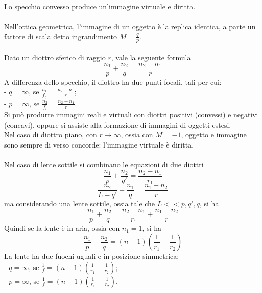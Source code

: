 \documentclass{article}
\begin{document}
Lo specchio convesso produce un’immagine virtuale e diritta.\\
\\
Nell’ottica geometrica, l’immagine di un oggetto è la replica identica, a parte un fattore di scala detto ingrandimento $M=\frac{q}{p}$.\\
\\
Dato un diottro sferico di raggio $r$, vale la seguente formula
\begin{equation}
    \frac{n_1}{p}+\frac{n_2}{q}=\frac{n_2-n_1}{r}
    \nonumber
\end{equation}
A differenza dello specchio, il diottro ha due punti focali, tali per cui:\\
- $q=\infty$, se $\frac{n_1}{f_e}=\frac{n_2-n_1}{r}$;\\
- $p=\infty$, se $\frac{n_2}{f_i}=\frac{n_2-n_1}{r}$.\\
Si può produrre immagini reali e virtuali con diottri positivi (convessi) e negativi (concavi), oppure si assiste alla formazione di immagini di oggetti estesi.\\
Nel caso di diottro piano, con $r\rightarrow \infty$, ossia con $M=-1$, oggetto e immagine sono sempre di verso concorde: l'immagine virtuale è diritta.\\
\\
Nel caso di lente sottile si combinano le equazioni di due diottri
\begin{equation}
    \frac{n_1}{p}+\frac{n_2}{q'}=\frac{n_2-n_1}{r_1}
    \nonumber
\end{equation}
\begin{equation}
    \frac{n_2}{L-q'}+\frac{n_1}{q}=\frac{n_1-n_2}{r}
    \nonumber
\end{equation}
ma considerando una lente sottile, ossia tale che $L<<p,q',q$, si ha
\begin{equation}
    \frac{n_1}{p}+\frac{n_2}{q}=\frac{n_2-n_1}{r_1}+\frac{n_1-n_2}{r}
    \nonumber
\end{equation}
Quindi se la lente è in aria, ossia con $n_1=1$, si ha
\begin{equation}
    \frac{n_1}{p}+\frac{n_2}{q}=(n-1)\left(\frac{1}{r_1}-\frac{1}{r_2}\right)
    \nonumber
\end{equation}
La lente ha due fuochi uguali e in posizione simmetrica:\\
- $q=\infty$, se $\frac{1}{f}=(n-1)\left(\frac{1}{r_1}-\frac{1}{r_2}\right)$;\\
- $p=\infty$, se $\frac{1}{f}=(n-1)\left(\frac{1}{r_1}-\frac{1}{r_2}\right)$.\\
\end{document}
